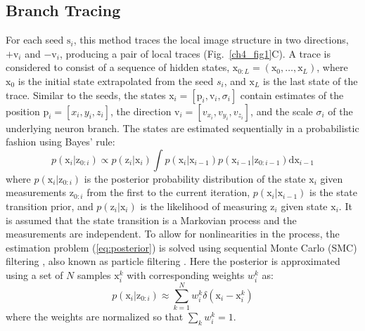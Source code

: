 \subsection{Branch Tracing}
\label{subsec:branch-tracing}
For each seed $\mathrm{s}_i$, this method traces the local image structure in two directions, $+\mathrm{v}_i$ and $-\mathrm{v}_i$, producing a pair of local traces (Fig.~\ref{ch4_fig1}C). A trace is considered to consist of a sequence of hidden states, $\mathrm{x}_{0:L} = (\mathrm{x}_0,\dots,\mathrm{x}_L)$, where $\mathrm{x}_0$ is the initial state extrapolated from the seed $s_i$, and $\mathrm{x}_L$ is the last state of the trace. Similar to the seeds, the states $\mathrm{x}_i = \left[ \mathrm{p}_i, \mathrm{v}_i, \sigma_i \right]$ contain estimates of the position $\mathrm{p}_i = \left[ x_i, y_i, z_i  \right]$, the direction $\mathrm{v}_i = \left[ v_{x_i}, v_{y_i}, v_{z_i} \right]$, and the scale $\sigma_i$ of the underlying neuron branch. The states are estimated sequentially in a probabilistic fashion using Bayes' rule:
\begin{equation}
p(\mathrm{x}_i | \mathrm{z}_{0:i}) \propto  p(\mathrm{z}_i | \mathrm{x}_i) \!\!\int\!\! p(\mathrm{x}_i | \mathrm{x}_{i-1}) p(\mathrm{x}_{i-1} | \mathrm{z}_{0:i-1}) \mathrm{dx}_{i-1}
\label{eq:posterior}
\end{equation}
where $p(\mathrm{x}_i | \mathrm{z}_{0:i})$ is the posterior probability distribution of the state $\mathrm{x}_i$ given measurements $\mathrm{z}_{0:i}$ from the first to the current iteration, $p(\mathrm{x}_i | \mathrm{x}_{i-1})$ is the state transition prior, and $p(\mathrm{z}_i | \mathrm{x}_i)$ is the likelihood of measuring $\mathrm{z}_i$ given state $\mathrm{x}_i$. It is assumed that the state transition is a Markovian process and the measurements are independent. To allow for nonlinearities in the process, the estimation problem (\ref{eq:posterior}) is solved using sequential Monte Carlo (SMC) filtering \cite{doucet2001introduction}, also known as particle filtering \cite{arulampalam2002tutorial}. Here the posterior is approximated using a set of $N$ samples $\mathrm{x}_{i}^k$ with corresponding weights $w_i^k$ as:
\begin{equation}
p(\mathrm{x}_i | \mathrm{z}_{0:i}) \approx \sum_{k=1}^{N} w_i^k \delta(\mathrm{x}_i - \mathrm{x}_i^k)
\label{eq:approx}
\end{equation}
where the weights are normalized so that $\sum_k w_i^k = 1$.

